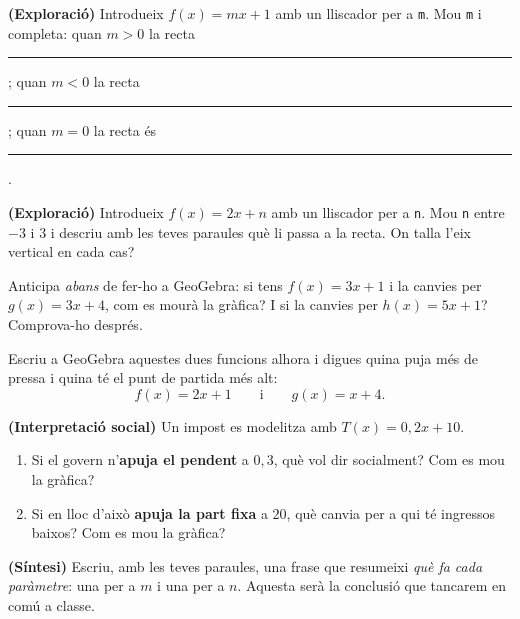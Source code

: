\begin{exercicis}
\begin{exlist}
  \item \textbf{(Exploració)} Introdueix $f(x)=mx+1$ amb un lliscador per a \texttt{m}.
        Mou \texttt{m} i completa: quan $m>0$ la recta \rule{2.5cm}{0.4pt}; quan
        $m<0$ la recta \rule{2.5cm}{0.4pt}; quan $m=0$ la recta és \rule{2.5cm}{0.4pt}.
  \item \textbf{(Exploració)} Introdueix $f(x)=2x+n$ amb un lliscador per a \texttt{n}.
        Mou \texttt{n} entre $-3$ i $3$ i descriu amb les teves paraules què li passa
        a la recta. On talla l'eix vertical en cada cas?
  \item Anticipa \emph{abans} de fer-ho a GeoGebra: si tens $f(x)=3x+1$ i la canvies
        per $g(x)=3x+4$, com es mourà la gràfica? I si la canvies per $h(x)=5x+1$?
        Comprova-ho després.
  \item Escriu a GeoGebra aquestes dues funcions alhora i digues quina puja més de
        pressa i quina té el punt de partida més alt:
        \[
        f(x)=2x+1 \qquad\text{i}\qquad g(x)=x+4.
        \]
  \item \textbf{(Interpretació social)} Un impost es modelitza amb $T(x)=0,2x+10$.
        \begin{enumerate}[label=\alph*), leftmargin=1.6em, topsep=2pt]
          \item Si el govern n'\textbf{apuja el pendent} a $0,3$, què vol dir
                socialment? Com es mou la gràfica?
          \item Si en lloc d'això \textbf{apuja la part fixa} a $20$, què canvia per a
                qui té ingressos baixos? Com es mou la gràfica?
        \end{enumerate}
  \item \textbf{(Síntesi)} Escriu, amb les teves paraules, una frase que resumeixi
        \emph{què fa cada paràmetre}: una per a $m$ i una per a $n$. Aquesta serà la
        conclusió que tancarem en comú a classe.
\end{exlist}
\end{exercicis}

